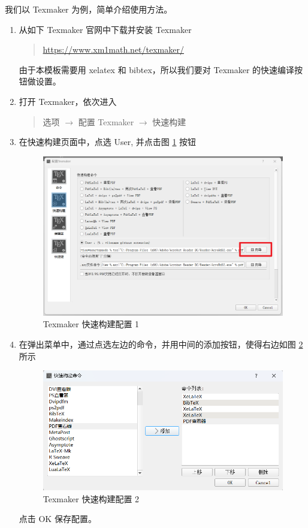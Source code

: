 \documentclass[twoside,doctor]{zjnuthesis}
\begin{document}
我们以 Texmaker 为例，简单介绍使用方法。
\begin{enumerate}[1.]
\item 从如下 Texmaker 官网中下载并安装 Texmaker
  \begin{quote}
    \url{https://www.xm1math.net/texmaker/}
  \end{quote}
  由于本模板需要用 xelatex 和 bibtex，所以我们要对 Texmaker 的快速编译按钮做设置。
  
\item 打开 Texmaker，依次进入
  \begin{quote}
    选项 \(\rightarrow\) 配置 Texmaker \(\rightarrow\) 快速构建
  \end{quote}
  
\item 在快速构建页面中，点选 User, 并点击图 \ref{fg:wizard} 按钮
  \begin{figure}[H]
    \centering
    \includegraphics[width=.8\textwidth]{images/texmakerWizard.png}
    \caption{Texmaker 快速构建配置 1}
    \label{fg:wizard}
  \end{figure}
  
\item 在弹出菜单中，通过点选左边的命令，并用中间的添加按钮，使得右边如图 \ref{fg:quick} 所示
  \begin{figure}[H]
    \centering
    \includegraphics[width=.8\textwidth]{images/quickBuild.png}
    \caption{Texmaker 快速构建配置 2}
    \label{fg:quick}
  \end{figure}
  点击 OK 保存配置。
  

\end{enumerate}
\end{document}
